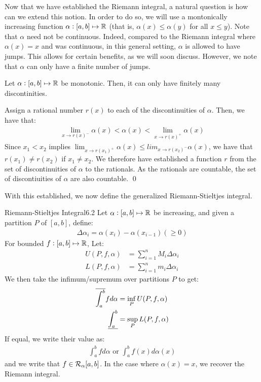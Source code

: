 \noindent Now that we have established the Riemann integral, a natural question is how can we extend this notion. In order to do so, we will use a montonically increasing function $\alpha: [a, b] \mapsto \mathbb{R}$ (that is, $\alpha(x) \leq \alpha(y)$ for all $x \leq y$). Note that $\alpha$ need not be continuous. Indeed, compared to the Riemann integral where $\alpha(x) = x$ and was continuous, in this general setting, $\alpha$ is allowed to have jumps. This allows for certain benefits, as we will soon discuss. However, we note that $\alpha$ can only have a finite number of jumps.

\begin{ntheorem}{ 4.30}{}
    Let $\alpha: [a, b] \mapsto \mathbb{R}$ be monotonic. Then, it can only have finitely many discontinities.
\end{ntheorem}
\begin{nproof}
    Assign a rational number $r(x)$ to each of the discontinuities of $\alpha$. Then, we have that:
    \begin{align*}
        \lim_{x \rightarrow r(x)^-} \alpha(x) < \alpha(x) < \lim_{x \rightarrow r(x)^+} \alpha(x)
    \end{align*}
    Since $x_1 < x_2$ implies $\lim_{x \rightarrow r(x_1)^+} \alpha(x) \leq lim_{x \rightarrow r(x_2)^-} \alpha(x)$, we have that $r(x_1) \neq r(x_2)$ if $x_1 \neq x_2$. We therefore have established a function $r$ from the set of discontinuities of $\alpha$ to the rationals. As the rationals are countable, the set of discontiuities of $\alpha$ are also countable. \qed
\end{nproof}

\noindent With this established, we now define the generalized Riemann-Stieltjes integral.

\begin{definition}{Riemann-Stieltjes Integral}{6.2}
    Let $\alpha: [a, b] \mapsto \mathbb{R}$ be increasing, and given a partition $P$ of $[a, b]$, define:
    \begin{align*}
        \Delta \alpha_i = \alpha(x_i) - \alpha(x_{i-1}) (\geq 0)
    \end{align*}
    For bounded $f: [a, b] \mapsto \mathbb{R}$, Let:
    \begin{align*}
        U(P, f, \alpha) &= \sum_{i=1}^n M_i \Delta \alpha_i
        \\ L(P, f, \alpha) &= \sum_{i=1}^n m_i \Delta \alpha_i
    \end{align*}
    We then take the infimum/supremum over partitions $P$ to get:
    \begin{align*}
        \overline{\int_{a}^{b}} f d\alpha &= \inf_P U(P, f, \alpha)
        \\ \underline{\int_{a}^{b}} &= \sup_P L(P, f, \alpha)
    \end{align*}
    If equal, we write their value as:
    \begin{align*}
        \int_a^b f d\alpha \text{ or } \int_a^b f(x)d\alpha(x)
    \end{align*}
    and we write that $f \in \mathcal{R}_\alpha[a, b]$. In the case where $\alpha(x) = x$, we recover the Riemann integral.
\end{definition}

